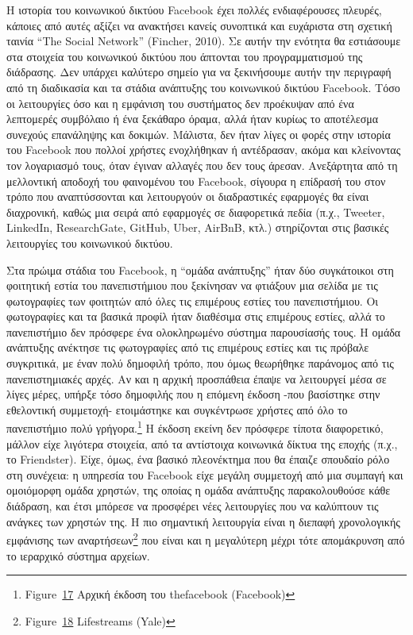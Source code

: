 \documentclass[
]{article}
\begin{document}
Η ιστορία του κοινωνικού δικτύου Facebook έχει πολλές ενδιαφέρουσες
πλευρές, κάποιες από αυτές αξίζει να ανακτήσει κανείς συνοπτικά και
ευχάριστα στη σχετική ταινία ``The Social Network'' (Fincher, 2010). Σε
αυτήν την ενότητα θα εστιάσουμε στα στοιχεία του κοινωνικού δικτύου που
άπτονται του προγραμματισμού της διάδρασης. Δεν υπάρχει καλύτερο σημείο
για να ξεκινήσουμε αυτήν την περιγραφή από τη διαδικασία και τα στάδια
ανάπτυξης του κοινωνικού δικτύου Facebook. Τόσο οι λειτουργίες όσο και η
εμφάνιση του συστήματος δεν προέκυψαν από ένα λεπτομερές συμβόλαιο ή ένα
ξεκάθαρο όραμα, αλλά ήταν κυρίως το αποτέλεσμα συνεχούς επανάληψης και
δοκιμών. Μάλιστα, δεν ήταν λίγες οι φορές στην ιστορία του Facebook που
πολλοί χρήστες ενοχλήθηκαν ή αντέδρασαν, ακόμα και κλείνοντας τον
λογαριασμό τους, όταν έγιναν αλλαγές που δεν τους άρεσαν. Ανεξάρτητα από
τη μελλοντική αποδοχή του φαινομένου του Facebook, σίγουρα η επίδρασή
του στον τρόπο που αναπτύσσονται και λειτουργούν οι διαδραστικές
εφαρμογές θα είναι διαχρονική, καθώς μια σειρά από εφαρμογές σε
διαφορετικά πεδία (π.χ., Tweeter, LinkedIn, ResearchGate, GitHub, Uber,
AirBnB, κτλ.) στηρίζονται στις βασικές λειτουργίες του κοινωνικού
δικτύου.

Στα πρώιμα στάδια του Facebook, η ``ομάδα ανάπτυξης'' ήταν δύο
συγκάτοικοι στη φοιτητική εστία του πανεπιστήμιου που ξεκίνησαν να
φτιάξουν μια σελίδα με τις φωτογραφίες των φοιτητών από όλες τις
επιμέρους εστίες του πανεπιστήμιου. Οι φωτογραφίες και τα βασικά προφίλ
ήταν διαθέσιμα στις επιμέρους εστίες, αλλά το πανεπιστήμιο δεν πρόσφερε
ένα ολοκληρωμένο σύστημα παρουσίασής τους. Η ομάδα ανάπτυξης ανέκτησε
τις φωτογραφίες από τις επιμέρους εστίες και τις πρόβαλε συγκριτικά, με
έναν πολύ δημοφιλή τρόπο, που όμως θεωρήθηκε παράνομος από τις
πανεπιστημιακές αρχές. Αν και η αρχική προσπάθεια έπαψε να λειτουργεί
μέσα σε λίγες μέρες, υπήρξε τόσο δημοφιλής που η επόμενη έκδοση -που
βασίστηκε στην εθελοντική συμμετοχή- ετοιμάστηκε και συγκέντρωσε χρήστες
από όλο το πανεπιστήμιο πολύ γρήγορα.\footnote{Figure~\protect\hyperlink{fig:facebook1}{17}
  Αρχική έκδοση του thefacebook (Facebook)} Η έκδοση εκείνη δεν πρόσφερε
τίποτα διαφορετικό, μάλλον είχε λιγότερα στοιχεία, από τα αντίστοιχα
κοινωνικά δίκτυα της εποχής (π.χ., το Friendster). Είχε, όμως, ένα
βασικό πλεονέκτημα που θα έπαιζε σπουδαίο ρόλο στη συνέχεια: η υπηρεσία
του Facebook είχε μεγάλη συμμετοχή από μια συμπαγή και ομοιόμορφη ομάδα
χρηστών, της οποίας η ομάδα ανάπτυξης παρακολουθούσε κάθε διάδραση, και
έτσι μπόρεσε να προσφέρει νέες λειτουργίες που να καλύπτουν τις ανάγκες
των χρηστών της. Η πιο σημαντική λειτουργία είναι η διεπαφή χρονολογικής
εμφάνισης των αναρτήσεων\footnote{Figure~\protect\hyperlink{fig:lifestreams}{18}
  Lifestreams (Yale)} που είναι και η μεγαλύτερη μέχρι τότε απομάκρυνση
από το ιεραρχικό σύστημα αρχείων.
\end{document}
